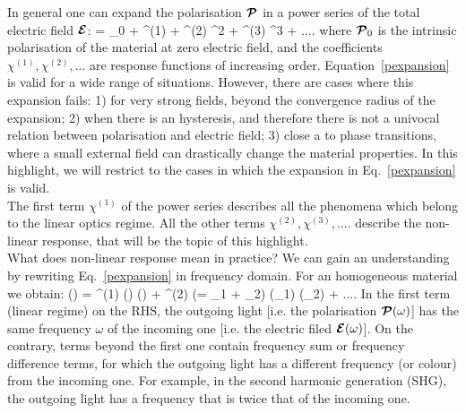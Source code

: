 In general one can expand the polarisation  ${\boldsymbol {\cal P}}$ in a power series of the total electric field ${\boldsymbol {\cal E}}$: 
\be
\PPc = \PPc_0 + \chi^{(1)} \EEc + \chi^{(2)} \EEc^2 + \chi^{(3)} \EEc^3 + ....
\label{pexpansion}
\ee
where ${\boldsymbol {\cal P}}_0$ is the intrinsic polarisation of the material at zero electric field, and the coefficients $\chi^{(1)}, \chi^{(2)},...$ are response functions of increasing order. Equation~\ref{pexpansion} is valid for a wide range of situations. However, there are cases where this expansion fails: 1) for very strong fields, beyond the convergence radius of the expansion\cite{lee2014first}; 2) when there is an hysteresis, and therefore there is not a univocal relation between polarisation and electric field; 3) close a to phase transitions, where a small external field can drastically change the material properties. In this highlight, we will restrict to the cases in which the expansion in Eq.~\ref{pexpansion} is valid.\\ 
The first term $\chi^{(1)}$ of the power series describes all the phenomena which belong to the linear optics regime. All the other terms  $\chi^{(2)}, \chi^{(3)},.... $  describe the non-linear response, that will be the topic of this highlight. \\
What does non-linear response mean in practice? We can gain an understanding by rewriting Eq.~\ref{pexpansion} in frequency domain. For an homogeneous material we obtain:
\be
\PPc(\omega) = \chi^{(1)} (\omega) \EEc(\omega)  + \chi^{(2)} (\omega = \omega_1 + \omega_2) \EEc(\omega_1) \EEc(\omega_2) + ....
\label{pexpomega}
\ee
In the first term (linear regime) on the RHS, the outgoing light [i.e. the polarisation ${\boldsymbol {\cal P}} (\omega)$] has the same frequency $\omega$ of the incoming one [i.e. the electric filed ${\boldsymbol {\cal E}} (\omega)$]. On the contrary, terms beyond the first one contain frequency sum or frequency difference terms, for which the outgoing light has a different frequency (or colour) from the incoming one.  For example, in the second harmonic generation (SHG), the outgoing light has a frequency that is twice that of the incoming one. \\
